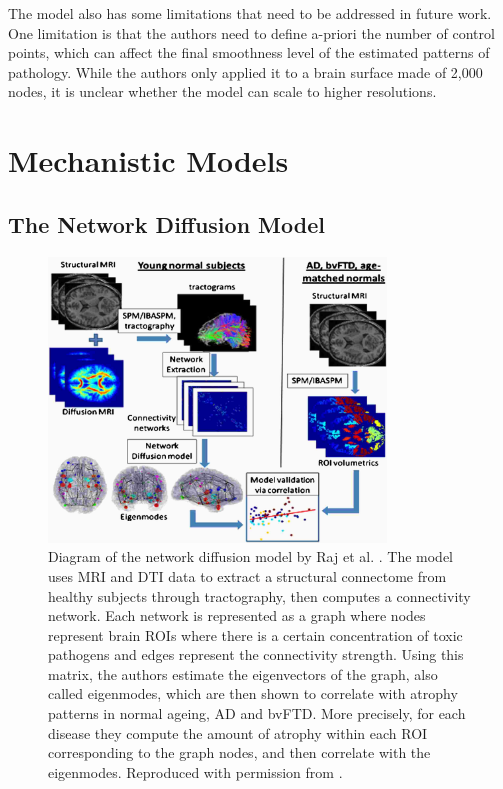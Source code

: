 The model also has some limitations that need to be addressed in future work. One limitation is that the authors need to define a-priori the number of control points, which can affect the final smoothness level of the estimated patterns of pathology. While the authors only applied it to a brain surface made of 2,000 nodes, it is unclear whether the model can scale to higher resolutions.

\section{Mechanistic Models}
\label{sec:bckMec}

\subsection{The Network Diffusion Model}
\label{sec:bckNet}

\begin{figure}[h]
\centering
\includegraphics[width=0.8\textwidth]{images/rajDiag}
\caption[Diagram of the network diffusion model by Raj et al. \cite{raj2012network}.]{Diagram of the network diffusion model by Raj et al. \cite{raj2012network}. The model uses MRI and DTI data to extract a structural connectome from healthy subjects through tractography, then computes a connectivity network. Each network is represented as a graph where nodes represent brain ROIs where there is a certain concentration of toxic pathogens and edges represent the connectivity strength. Using this matrix, the authors estimate the eigenvectors of the graph, also called eigenmodes, which are then shown to correlate with atrophy patterns in normal ageing, AD and bvFTD. More precisely, for each disease they compute the amount of atrophy within each ROI corresponding to the graph nodes, and then correlate with the eigenmodes. Reproduced with permission from \cite{raj2012network}.}
\label{fig:bckRaj}
\end{figure}


